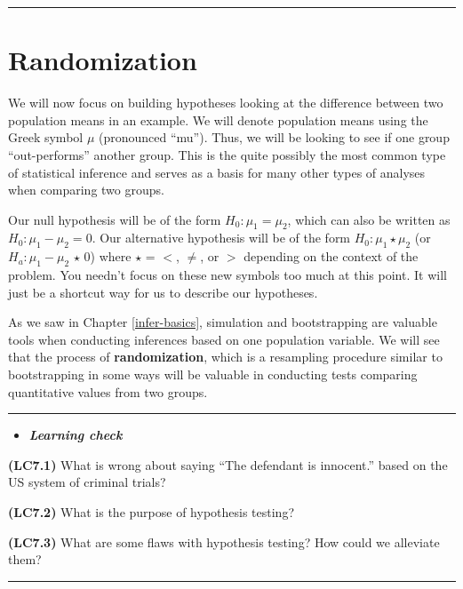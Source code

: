\documentclass[]{tufte-book}
\newenvironment{rmdblock}[1]
  {\begin{shaded*}
  \begin{itemize}
  \renewcommand{\labelitemi}{
    \raisebox{-.7\height}[0pt][0pt]{
    }
  }
  \item
  }
  {
  \end{itemize}
  \end{shaded*}
  }
\newenvironment{learncheck}
  {\begin{rmdblock}{warning}}
  {\end{rmdblock}}
\begin{document}
\begin{center}\rule{\linewidth}{\linethickness}\end{center}

\section{Randomization}\label{randomization}

We will now focus on building hypotheses looking at the difference
between two population means in an example. We will denote population
means using the Greek symbol \(\mu\) (pronounced ``mu''). Thus, we will
be looking to see if one group ``out-performs'' another group. This is
the quite possibly the most common type of statistical inference and
serves as a basis for many other types of analyses when comparing two
groups.

Our null hypothesis will be of the form \(H_0: \mu_1 = \mu_2\), which
can also be written as \(H_0: \mu_1 - \mu_2 = 0\). Our alternative
hypothesis will be of the form \(H_0: \mu_1 \star \mu_2\) (or
\(H_a: \mu_1 - \mu_2 \, \star \, 0\)) where \(\star\) = \(<\), \(\ne\),
or \(>\) depending on the context of the problem. You needn't focus on
these new symbols too much at this point. It will just be a shortcut way
for us to describe our hypotheses.

As we saw in Chapter \ref{infer-basics}, simulation and bootstrapping
are valuable tools when conducting inferences based on one population
variable. We will see that the process of \textbf{randomization}, which
is a resampling procedure similar to bootstrapping in some ways will be
valuable in conducting tests comparing quantitative values from two
groups.

\begin{center}\rule{\linewidth}{\linethickness}\end{center}\begin{learncheck}
\textbf{\emph{Learning check}}
\end{learncheck}

\textbf{(LC7.1)} What is wrong about saying ``The defendant is
innocent.'' based on the US system of criminal trials?

\textbf{(LC7.2)} What is the purpose of hypothesis testing?

\textbf{(LC7.3)} What are some flaws with hypothesis testing? How could
we alleviate them?

\begin{center}\rule{\linewidth}{\linethickness}\end{center}
\end{document}
